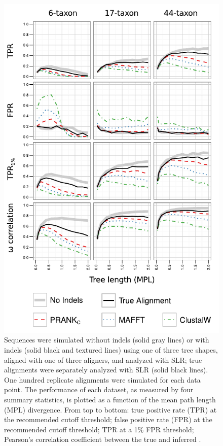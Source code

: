 \begin{figure}[t!]
\centering
\includegraphics[scale=0.9]{Figs/fig3.pdf}
\caption{Sequences were simulated without indels (solid gray lines) or with
  indels (solid black and textured lines) using one of three tree shapes, aligned with
  one of three aligners, and analyzed with SLR; true alignments were
  separately analyzed with SLR (solid black lines). One hundred
  replicate alignments were simulated for each data point. The
  performance of each dataset, as measured by four summary statistics,
  is plotted as a function of the mean path length (MPL)
  divergence. From top to bottom: true positive rate (TPR) at the
  recommended cutoff threshold; false positive rate (FPR) at the
  recommended cutoff threshold; TPR at a 1\% FPR threshold; Pearson's
  correlation coefficient between the true and inferred \omg.}
\label{fig_3}
\end{figure}

